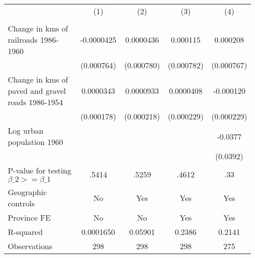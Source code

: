 {
\def\sym#1{\ifmmode^{#1}\else\(^{#1}\)\fi}
\begin{tabular}{l*{4}{c}}
\hline\hline
                &\multicolumn{1}{c}{(1)}&\multicolumn{1}{c}{(2)}&\multicolumn{1}{c}{(3)}&\multicolumn{1}{c}{(4)}\\
                &\multicolumn{1}{c}{}&\multicolumn{1}{c}{}&\multicolumn{1}{c}{}&\multicolumn{1}{c}{}\\
\hline
Change in kms of railroads 1986-1960&-0.0000425         &0.0000436         & 0.000115         & 0.000208         \\
                &(0.000764)         &(0.000780)         &(0.000782)         &(0.000767)         \\
[1em]
Change in kms of paved and gravel roads 1986-1954&0.0000343         &0.0000933         &0.0000408         &-0.000120         \\
                &(0.000178)         &(0.000218)         &(0.000229)         &(0.000229)         \\
[1em]
Log urban population 1960&                  &                  &                  &  -0.0377         \\
                &                  &                  &                  & (0.0392)         \\
\hline
P-value for testing $\beta\_{2} >= \beta\_{1}$&    .5414         &    .5259         &    .4612         &      .33         \\
Geographic controls&       No         &      Yes         &      Yes         &      Yes         \\
Province FE     &       No         &       No         &      Yes         &      Yes         \\
R-squared       &0.0001650         &  0.05901         &   0.2386         &   0.2141         \\
Observations    &      298         &      298         &      298         &      275         \\
\hline\hline
\end{tabular}
}
